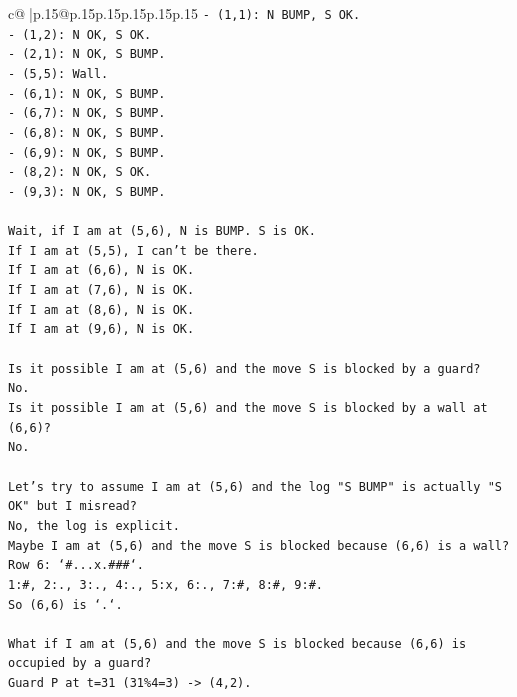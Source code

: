 \documentclass{article}
\begin{document}
{\begin{supertabular}{c@{$\;$}|p{.15\linewidth}@{}p{.15\linewidth}p{.15\linewidth}p{.15\linewidth}p{.15\linewidth}p{.15\linewidth}}
{{{\texttt{{-} (1,1): N BUMP, S OK.} \\
\texttt{{-} (1,2): N OK, S OK.} \\
\texttt{{-} (2,1): N OK, S BUMP.} \\
\texttt{{-} (5,5): Wall.} \\
\texttt{{-} (6,1): N OK, S BUMP.} \\
\texttt{{-} (6,7): N OK, S BUMP.} \\
\texttt{{-} (6,8): N OK, S BUMP.} \\
\texttt{{-} (6,9): N OK, S BUMP.} \\
\texttt{{-} (8,2): N OK, S OK.} \\
\texttt{{-} (9,3): N OK, S BUMP.} \\
\\ 
\texttt{Wait, if I am at (5,6), N is BUMP. S is OK.} \\
\texttt{If I am at (5,5), I can't be there.} \\
\texttt{If I am at (6,6), N is OK.} \\
\texttt{If I am at (7,6), N is OK.} \\
\texttt{If I am at (8,6), N is OK.} \\
\texttt{If I am at (9,6), N is OK.} \\
\\ 
\texttt{Is it possible I am at (5,6) and the move S is blocked by a guard?} \\
\texttt{No.} \\
\texttt{Is it possible I am at (5,6) and the move S is blocked by a wall at (6,6)?} \\
\texttt{No.} \\
\\ 
\texttt{Let's try to assume I am at (5,6) and the log "S BUMP" is actually "S OK" but I misread?} \\
\texttt{No, the log is explicit.} \\
\texttt{Maybe I am at (5,6) and the move S is blocked because (6,6) is a wall?} \\
\texttt{Row 6: `\#...x.\#\#\#`.} \\
\texttt{1:\#, 2:., 3:., 4:., 5:x, 6:., 7:\#, 8:\#, 9:\#.} \\
\texttt{So (6,6) is `.`.} \\
\\ 
\texttt{What if I am at (5,6) and the move S is blocked because (6,6) is occupied by a guard?} \\
\texttt{Guard P at t=31 (31\%4=3) {-}> (4,2).} \\
}}}
\end{supertabular}}
\end{document}
